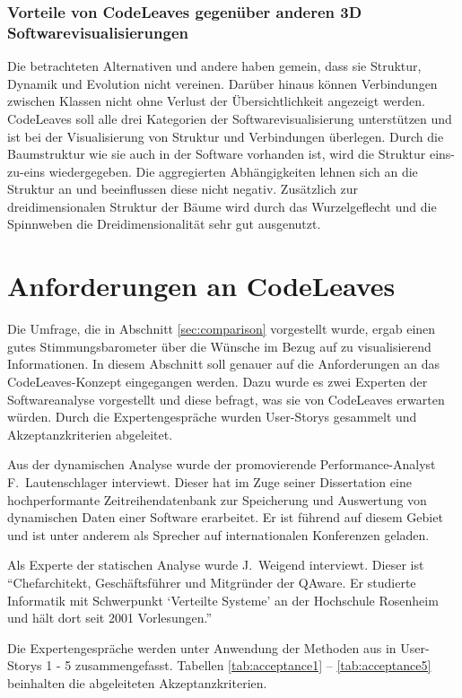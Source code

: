 \subsubsection*{Vorteile von CodeLeaves gegenüber anderen 3D Softwarevisualisierungen}
Die betrachteten Alternativen und andere haben gemein, dass sie Struktur, Dynamik und Evolution nicht vereinen. Darüber hinaus können Verbindungen zwischen Klassen nicht ohne Verlust der Übersichtlichkeit angezeigt werden. CodeLeaves soll alle drei Kategorien der Softwarevisualisierung unterstützen und ist bei der Visualisierung von Struktur und Verbindungen überlegen. Durch die Baumstruktur wie sie auch in der Software vorhanden ist, wird die Struktur eins-zu-eins wiedergegeben. Die aggregierten Abhängigkeiten lehnen sich an die Struktur an und beeinflussen diese nicht negativ. Zusätzlich zur dreidimensionalen Struktur der Bäume wird durch das Wurzelgeflecht und die Spinnweben die Dreidimensionalität sehr gut ausgenutzt.

\section{Anforderungen an CodeLeaves}
\label{sec:requirements}

Die Umfrage, die in Abschnitt \ref{sec:comparison} vorgestellt wurde, ergab einen gutes Stimmungsbarometer über die Wünsche im Bezug auf zu visualisierend Informationen. In diesem Abschnitt soll genauer auf die Anforderungen an das CodeLeaves-Konzept eingegangen werden. Dazu wurde es zwei Experten der Softwareanalyse vorgestellt und diese befragt, was sie von CodeLeaves erwarten würden. Durch die Expertengespräche wurden User-Storys gesammelt und Akzeptanzkriterien abgeleitet.

Aus der dynamischen Analyse wurde der promovierende Performance-Analyst F.\ Lautenschlager interviewt. Dieser hat im Zuge seiner Dissertation eine hochperformante Zeitreihendatenbank zur Speicherung und Auswertung von dynamischen Daten einer Software erarbeitet. Er ist führend auf diesem Gebiet und ist unter anderem als Sprecher auf internationalen Konferenzen geladen.

Als Experte der statischen Analyse wurde J.\ Weigend interviewt. Dieser ist "`Chefarchitekt, Geschäftsführer und Mitgründer der QAware. Er studierte Informatik mit Schwerpunkt \enquote*{Verteilte Systeme} an der Hochschule Rosenheim und hält dort seit 2001 Vorlesungen."' \cite{qaware2017johannes}

Die Expertengespräche werden unter Anwendung der Methoden aus \cite{cohn2004user} in User-Storys 1 - 5 zusammengefasst. Tabellen \ref{tab:acceptance1} -- \ref{tab:acceptance5} beinhalten die abgeleiteten Akzeptanzkriterien.

